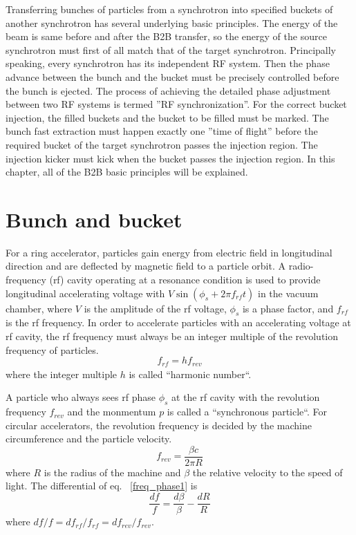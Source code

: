 Transferring bunches of particles from a synchrotron into specified buckets of another synchrotron has several underlying basic principles. The energy of the beam is same before and after the B2B transfer, so the energy of the source synchrotron must first of all match that of the target synchrotron. Principally speaking, every synchrotron has its independent RF system. Then the phase advance between the bunch and the bucket must be precisely controlled before the bunch is ejected. The process of achieving the detailed phase adjustment between two RF systems is termed ''RF synchronization''. For the correct bucket injection, the filled buckets and the bucket to be filled must be marked. The bunch fast extraction must happen exactly one ''time of flight'' before the required bucket of the target synchrotron passes the injection region. The injection kicker must kick when the bucket passes the injection region.  In this chapter, all of the B2B basic principles will be explained.  

\section{Bunch and bucket}
For a ring accelerator, particles gain energy from electric field in longitudinal direction and are deflected by magnetic field to a particle orbit. A radio-frequency (rf) cavity operating at a resonance condition is used to provide longitudinal accelerating voltage with $V\sin(\phi_\mathit{s}+2\pi f_\mathit{rf}t)$ in the vacuum chamber, where $V$ is the amplitude of the rf voltage, $\phi_\mathit{s}$ is a phase factor, and $f_{\mathit{rf}}$ is the rf frequency. In order to accelerate particles with an accelerating voltage at rf cavity, the rf frequency must always be an integer multiple of the revolution frequency of particles. 
\begin{equation}
	f_{\mathit{rf}}=hf_{\mathit{rev}}\label{harmonic_number}
\end{equation}
where the integer multiple $h$ is called ``harmonic number``. 

A particle who always sees rf phase $\phi_\mathit{s}$ at the rf cavity with the revolution frequency $f_{\mathit{rev}}$ and the monmentum $p$ is called a ``synchronous particle``. For circular accelerators, the revolution frequency is decided by the machine circumference and the particle velocity.
\begin{equation}
f_{\mathit{rev}}=\frac{\beta c}{2\pi R} \label{freq_phase1}
\end{equation}
where $R$ is the radius of the machine and $\beta$ the relative velocity to the speed of light. The differential of eq. ~\ref{freq_phase1} is
\begin{equation}
\frac{df}{f}=\frac{d\beta}{\beta}-\frac{dR}{R} \label{dfreq_phase1}
\end{equation}
where $df/f=df_{\mathit{rf}}/f_{\mathit{rf}}=df_{\mathit{rev}}/f_{\mathit{rev}}$. 

